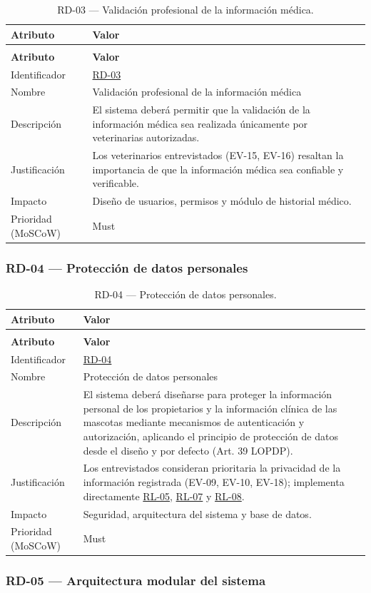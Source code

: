 \documentclass[journal,onecolumn]{IEEEtran}
\makeatletter
\newenvironment{atributos}[2]{%
	\small
	\begin{longtable}{@{}>{\raggedright\arraybackslash}p{4.2cm} >{\raggedright\arraybackslash}p{11.2cm}@{}}
		\caption{#2}\label{tab:#1}\\
		\toprule
		\textbf{Atributo} & \textbf{Valor} \\
		\midrule
		\endfirsthead
		\multicolumn{2}{@{}l}{\small\itshape (continuación)}\\
		\toprule
		\textbf{Atributo} & \textbf{Valor} \\
		\midrule
		\endhead
		\bottomrule
		\endlastfoot
	}{%
	\end{longtable}
	\normalsize
}
\makeatother
\begin{document}
	\begin{atributos}{RD-03}{RD-03 --- Validación profesional de la información médica.}
		Identificador & \hyperref[tab:RD-03]{RD-03} \\
		Nombre & Validación profesional de la información médica \\
		Descripción & El sistema deberá permitir que la validación de la información médica sea realizada únicamente por veterinarias autorizadas. \\
		Justificación & Los veterinarios entrevistados (EV-15, EV-16) resaltan la importancia de que la información médica sea confiable y verificable. \\
		Impacto & Diseño de usuarios, permisos y módulo de historial médico. \\
		Prioridad (MoSCoW) & Must \\
	\end{atributos}
	
	\subsubsection{RD-04 --- Protección de datos personales}
	
	\begin{atributos}{RD-04}{RD-04 --- Protección de datos personales.}
		Identificador & \hyperref[tab:RD-04]{RD-04} \\
		Nombre & Protección de datos personales \\
		Descripción & El sistema deberá diseñarse para proteger la información personal de los propietarios y la información clínica de las mascotas mediante mecanismos de autenticación y autorización, aplicando el principio de protección de datos desde el diseño y por defecto (Art. 39 LOPDP). \\
		Justificación & Los entrevistados consideran prioritaria la privacidad de la información registrada (EV-09, EV-10, EV-18); implementa directamente \hyperref[rl:05]{RL-05}, \hyperref[rl:07]{RL-07} y \hyperref[rl:08]{RL-08}. \\
		Impacto & Seguridad, arquitectura del sistema y base de datos. \\
		Prioridad (MoSCoW) & Must \\
	\end{atributos}
	
	\subsubsection{RD-05 --- Arquitectura modular del sistema}
	
\end{document}
